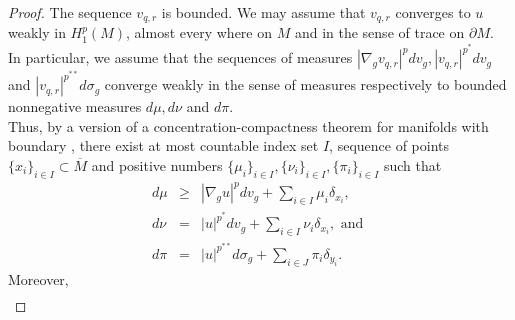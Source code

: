 \documentclass{Tran-l}
\theoremstyle{definition}
\theoremstyle{remark}
\numberwithin{equation}{section}
\begin{document}
\begin{proof}
The sequence $v_{q,r}$ is bounded. We may assume that $v_{q,r}$
converges to $u$ weakly in $H^p_1(M)$, almost every where on $M$ and
in the sense of trace on $\partial M$.\\ In particular, we assume
that the sequences of measures
$|\nabla_gv_{q,r}|^pdv_g,|v_{q,r}|^{p^*}dv_g$ and
$|v_{q,r}|^{p^{**}}d\sigma_g$ converge weakly in the sense of
measures respectively to bounded nonnegative measures $d\mu,d\nu$ and $d\pi$.\\
Thus, by a version of a concentration-compactness theorem for
manifolds with boundary \cite{Biezuner}, there exist at most
countable index set $I$, sequence of points $\{x_i\}_{i\in
I}\subset\overline M$ and positive numbers $\{\mu_i\}_{i\in I},
\{\nu_i\}_{i\in I}, \{\pi_i\}_{i\in I}$ such that
\begin{eqnarray*}
  d\mu &\ge& |\nabla_gu|^pdv_g +\sum_{i\in I}\mu_i\delta_{x_i},\\
  d\nu &=&|u|^{p^*}dv_g+ \sum_{i\in I}\nu_i\delta_{x_i}, \text{ and } \\
  d\pi &=&|u|^{p^{**}}d\sigma_g+\sum_{i\in J}\pi_i\delta_{y_i}.
\end{eqnarray*}
Moreover, \begin{eqnarray*}
          

\end{eqnarray*}
\end{proof}
\end{document}
